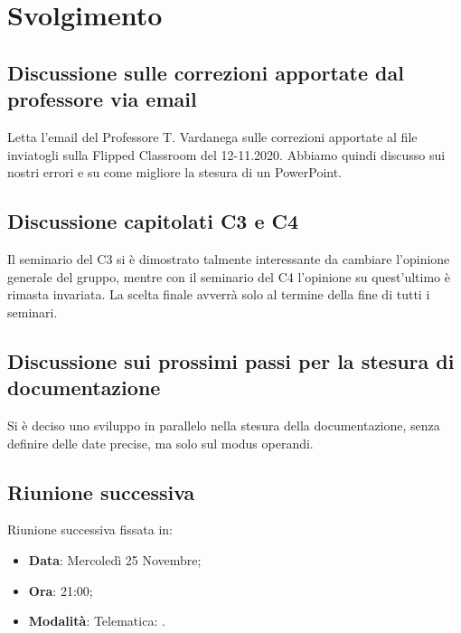 \documentclass[]{article}
\begin{document}
	\newpage

	\section{Svolgimento}
		\subsection{Discussione sulle correzioni apportate dal professore via email}
		Letta l'email del Professore T. Vardanega sulle correzioni apportate al file inviatogli sulla Flipped Classroom del 12-11.2020.
		Abbiamo quindi discusso sui nostri errori e su come migliore la stesura di un PowerPoint.\\
		
		\subsection{Discussione capitolati C3 e C4}
		Il seminario del  C3 si è dimostrato talmente interessante da cambiare l'opinione generale del gruppo, mentre con il seminario del  C4 l'opinione su quest'ultimo è rimasta invariata. La scelta finale avverrà solo al termine della fine di tutti i seminari.\\
		
		\subsection{Discussione sui prossimi passi per la stesura di documentazione}
		Si è deciso uno sviluppo in parallelo nella stesura della documentazione, senza definire delle date precise, ma solo sul modus operandi.\\
		
		\subsection{Riunione successiva}
		Riunione successiva fissata in:
		\begin{itemize}
			\item \textbf{Data}: Mercoledì 25 Novembre;
			\item \textbf{Ora}: 21:00;
			\item \textbf{Modalità}: Telematica: .
		\end{itemize}
	
\end{document}
